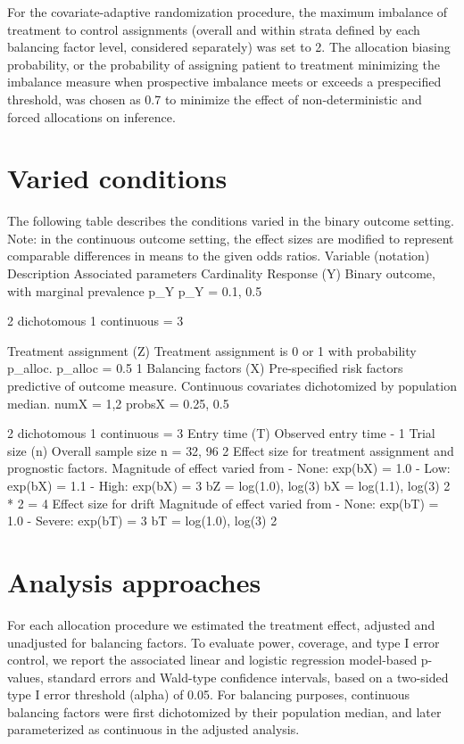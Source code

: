 For the covariate-adaptive randomization procedure, the maximum imbalance of treatment to control assignments (overall and within strata defined by each balancing factor level, considered separately) was set to 2.  
The allocation biasing probability, or the probability of assigning patient to treatment minimizing the imbalance measure when prospective imbalance meets or exceeds a prespecified threshold, was chosen as 0.7 to minimize the effect of non-deterministic and forced allocations on inference.

\section{Varied conditions}
The following table describes the conditions varied in the binary outcome setting. Note: in the continuous outcome setting, the effect sizes are modified to represent comparable differences in means to the given odds ratios.
Variable (notation)
Description
Associated parameters
Cardinality
Response (Y)
Binary outcome, with marginal prevalence p_Y 
p_Y = {0.1, 0.5}

2 dichotomous
1 continuous = 3

Treatment assignment (Z)
Treatment assignment is 0 or 1 with probability p_alloc.
p_alloc = {0.5}
1
Balancing factors (X)
Pre-specified risk factors predictive of outcome measure.
Continuous covariates dichotomized by population median.
numX = {1,2}
probsX = {0.25, 0.5}

2 dichotomous
1 continuous = 3
Entry time (T)
Observed entry time
-
1
Trial size (n)
Overall sample size 
n = {32, 96}
2
Effect size for treatment assignment and prognostic factors.
Magnitude of effect varied from
-	None: exp(bX) = 1.0
-	Low: exp(bX) = 1.1
-	High: exp(bX) = 3
bZ = {log(1.0), log(3)}
bX = {log(1.1), log(3)}
2 * 2 = 4
Effect size for drift
Magnitude of effect varied from
-	None: exp(bT) = 1.0
-	Severe: exp(bT) = 3
bT = {log(1.0), log(3)}
2

\section{Analysis approaches}
For each allocation procedure we estimated the treatment effect, adjusted and unadjusted for balancing factors.  To evaluate power, coverage, and type I error control, we report the associated linear and logistic regression model-based p-values, standard errors and Wald-type confidence intervals, based on a two-sided type I error threshold (alpha) of 0.05.  For balancing purposes, continuous balancing factors were first dichotomized by their population median, and later parameterized as continuous in the adjusted analysis.


